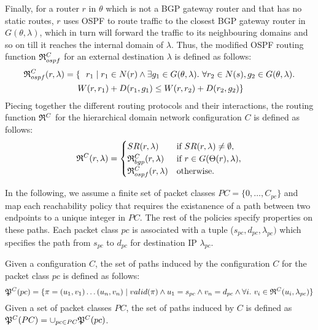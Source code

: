 Finally, for a router $r$ in $\theta$ which is not a BGP gateway 
router and that has no static routes, $r$ uses OSPF to route traffic to the closest BGP
gateway router in $G (\theta, \lambda)$, which in turn will forward  the traffic to its neighbouring domains and so on till it reaches the internal domain of $\lambda$.  Thus, the modified OSPF routing 
function $\mathfrak{R}^C_{ospf}$ for an external destination $\lambda$
is defined as follows: 
\begin{multline*}
\mathfrak{R}_{ospf}^C(r,\lambda) = \{~~r_1 \mid r_1 \in N(r) \wedge \exists g_1 \in G (\theta, \lambda). ~\forall r_2 \in N(s), g_2 \in G (\theta, \lambda). \\ ~W(r, r_1) + D(r_1, g_1) \leq
W(r, r_2) + D(r_2, g_2)\}
\end{multline*}
Piecing together the different routing protocols and their 
interactions, the routing function 
$\mathfrak{R}^C$ for the hierarchical domain network configuration $C$ is defined as follows: 
\[
\mathfrak{R}^C(r, \lambda) = 
\begin{cases}
SR(r, \lambda) & \text{if } SR(r, \lambda) \not= \emptyset, \\
\mathfrak{R}_{bgp}^C(r, \lambda) & \text{if }r \in G(\Theta(r), \lambda), \\
\mathfrak{R}_{ospf}^C(r, \lambda) & \text{otherwise.} 
\end{cases}
\]

In the following, we assume a finite set of packet classes $PC = \{0, \ldots, C_{pc}\}$ 
and map each reachability
policy that requires the existanence of a path between two endpoints
to a unique integer in $PC$. The rest of the policies specify 
properties on these paths. Each packet class $pc$ is associated
with a tuple ($s_{pc}, d_{pc}, \lambda_{pc})$ which specifies 
the path from $s_{pc}$ to $d_{pc}$ for destination IP $\lambda_{pc}$.

\begin{definition} \label{def:inducedpaths}
Given a configuration $C$, the set of paths induced
by the configuration $C$ for the packet class $pc$ is defined as follows:
\[
\mathfrak{P}^C(pc) = \{\pi=(u_1, v_1)\ldots (u_n, v_n) \mid 
valid(\pi) \wedge 
u_1 = s_{pc} \wedge v_n= d_{pc} \wedge
\forall i. ~v_i \in \mathfrak{R}^C(u_i,\lambda_{pc})\}
\]
Given a set of packet classes $PC$, the set of paths
 induced by $C$ is defined as
$\mathfrak{P}^C(PC) = \cup_{pc\in PC} \mathfrak{P}^C(pc)$.
\end{definition}

